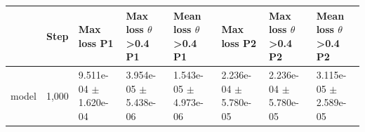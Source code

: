 \begin{tabular}{llllllll}
\toprule
 & Step & Max loss P1 & Max loss $\theta$>0.4 P1 & Mean loss $\theta$>0.4 P1 & Max loss P2 & Max loss $\theta$>0.4 P2 & Mean loss $\theta$>0.4 P2 \\
\midrule
model & 1,000 & 9.511e-04 $\pm$ 1.620e-04 & 3.954e-05 $\pm$ 5.438e-06 & 1.543e-05 $\pm$ 4.973e-06 & 2.236e-04 $\pm$ 5.780e-05 & 2.236e-04 $\pm$ 5.780e-05 & 3.115e-05 $\pm$ 2.589e-05 \\
\bottomrule
\end{tabular}
